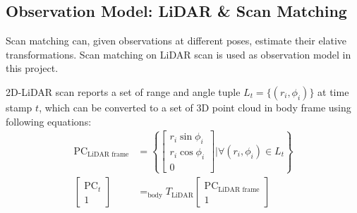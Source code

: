 \documentclass[conference]{IEEEtran}
\begin{document}
\subsection{Observation Model: LiDAR \& Scan Matching}
Scan matching can, given observations at different poses,
estimate their elative transformations.
Scan matching on LiDAR scan is used as observation model in this project.

2D-LiDAR scan reports a set of range and angle tuple $L_t = \{(r_i, \phi_i)\}$ at time stamp $t$,
which can be converted to a set of 3D point cloud in body frame using following equations:
$$
\begin{aligned}
    \mathrm{PC}_{\text{LiDAR frame}} 
        &= \left\{ \left[ \begin{gathered}r_i\sin \phi_i \\ r_i\cos \phi_i \\ 0\end{gathered} \right] \bigg| \forall (r_i, \phi_i)\in L_t\right\} 
        \\
    \left[ \begin{gathered} \mathrm{PC}_t \\ 1\end{gathered} \right]  
    &= _{\text{body}}T_{\text{LiDAR}}  \left[ \begin{gathered} \mathrm{PC}_{\text{LiDAR frame}}  \\ 1\end{gathered} \right]  
\end{aligned}
$$
\end{document}
